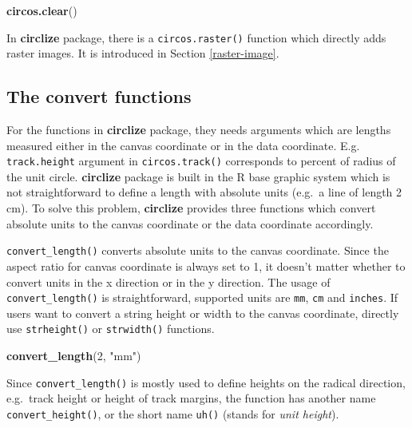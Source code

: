 \documentclass[]{book}
\newenvironment{Shaded}{\begin{snugshade}}{\end{snugshade}}
\newcommand{\KeywordTok}[1]{\textcolor[rgb]{0.13,0.29,0.53}{\textbf{#1}}}
\newcommand{\DecValTok}[1]{\textcolor[rgb]{0.00,0.00,0.81}{#1}}
\newcommand{\StringTok}[1]{\textcolor[rgb]{0.31,0.60,0.02}{#1}}
\newcommand{\NormalTok}[1]{#1}
\theoremstyle{definition}
\theoremstyle{definition}
\theoremstyle{remark}
\begin{document}
\begin{Shaded}
\begin{Highlighting}[]
\KeywordTok{circos.clear}\NormalTok{()}
\end{Highlighting}
\end{Shaded}

In \textbf{circlize} package, there is a \texttt{circos.raster()}
function which directly adds raster images. It is introduced in Section
\ref{raster-image}.

\subsection{The convert functions}\label{convert-functions}

For the functions in \textbf{circlize} package, they needs arguments
which are lengths measured either in the canvas coordinate or in the
data coordinate. E.g. \texttt{track.height} argument in
\texttt{circos.track()} corresponds to percent of radius of the unit
circle. \textbf{circlize} package is built in the R base graphic system
which is not straightforward to define a length with absolute units
(e.g.~a line of length 2 cm). To solve this problem, \textbf{circlize}
provides three functions which convert absolute units to the canvas
coordinate or the data coordinate accordingly.

\texttt{convert\_length()} converts absolute units to the canvas
coordinate. Since the aspect ratio for canvas coordinate is always set
to 1, it doesn't matter whether to convert units in the x direction or
in the y direction. The usage of \texttt{convert\_length()} is
straightforward, supported units are \texttt{mm}, \texttt{cm} and
\texttt{inches}. If users want to convert a string height or width to
the canvas coordinate, directly use \texttt{strheight()} or
\texttt{strwidth()} functions.

\begin{Shaded}
\begin{Highlighting}[]
\KeywordTok{convert_length}\NormalTok{(}\DecValTok{2}\NormalTok{, }\StringTok{"mm"}\NormalTok{)}
\end{Highlighting}
\end{Shaded}

Since \texttt{convert\_length()} is mostly used to define heights on the
radical direction, e.g.~track height or height of track margins, the
function has another name \texttt{convert\_height()}, or the short name
\texttt{uh()} (stands for \emph{unit height}).
\end{document}
